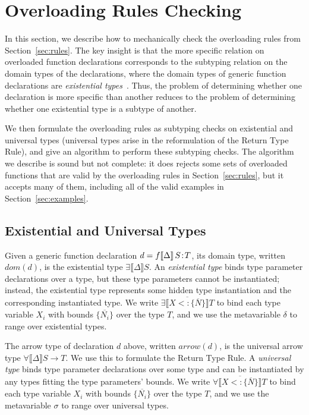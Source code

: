\documentclass[10pt]{sigplanconf}
\renewcommand{\bar}{\overline}
\newcommand{\extends}{\ensuremath{<:}}
\newcommand{\dom}{\ensuremath{\mathit{dom}}}
\newcommand{\arrow}{\ensuremath{\mathit{arrow}}}
\newcommand{\ob}[1]{\ensuremath{\llbracket {#1} \rrbracket}}
\newcommand{\bd}[1]{\ensuremath{\{\bar{#1}\}}}
\newcommand{\bds}[2]{\ensuremath{\bar{{#1} \extends \bd{#2}}}}
\newcommand{\tplist}[2]{\ensuremath{\ob{\bds{#1}{#2}}}}
\newcommand{\hdeclg}[4]{\mbox{\ensuremath{#1 \ob{#2}\, #3\!:\!#4}}}
\begin{document}
\section{Overloading Rules Checking}
\label{sec:checking}


In this section,
we describe how to mechanically check 
the overloading rules from Section~\ref{sec:rules}. 
The key insight is that the more specific relation 
on overloaded function declarations
corresponds to the subtyping relation 
on the domain types of the declarations, 
where the domain types of generic function declarations 
are \emph{existential types}~\cite{bourdoncle97}.
Thus, the problem of determining whether one declaration 
is more specific than another 
reduces to the problem of determining 
whether one existential type is a subtype of another.

We then formulate the overloading rules 
as subtyping checks on existential and universal types 
(universal types arise in the reformulation 
of the Return Type Rule),
and give an algorithm 
to perform these subtyping checks.
The algorithm we describe is sound but not complete:
it does rejects some sets of overloaded functions 
that are valid by the overloading rules in Section~\ref{sec:rules}, 
but it accepts many of them, 
including all of the valid examples in Section~\ref{sec:examples}.

\subsection{Existential and Universal Types}

Given a generic function declaration $d = \hdeclg{f}{\Delta}{S}{T}$,
its domain type, written $\dom(d)$, 
is the existential type $\exists\ob{\Delta}{S}$.
An \emph{existential type} binds type parameter declarations over a type, 
but these type parameters cannot be instantiated; 
instead, the existential type represents some hidden type instantiation 
and the corresponding instantiated type. We write
$\exists\tplist{X}{N}T$ to bind each type variable $X_i$ with bounds
$\{\bar{N_i}\}$ over the type $T$, and we use the metavariable $\delta$ to
range over existential types.

The arrow type of declaration $d$ above, written $\arrow(d)$, 
is the universal arrow type \mbox{$\forall\ob{\Delta}S \rightarrow T$}.
We use this to formulate the Return Type Rule.
A \emph{universal type} binds type parameter declarations over some type and
can be instantiated by any types fitting the type parameters' bounds.
We write $\forall\tplist{X}{N}T$ to bind each type variable $X_i$ 
with bounds $\{\bar{N_i}\}$ over the type $T$, 
and we use the metavariable $\sigma$ to range over universal types.
\end{document}
